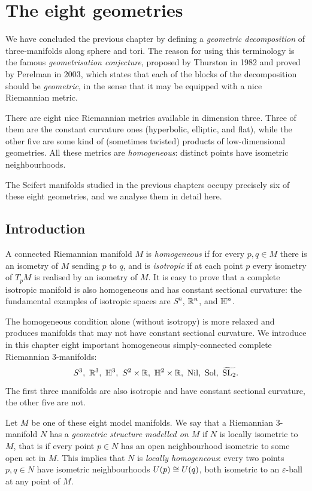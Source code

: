 \chapter{The eight geometries} \label{eight:chapter}
We have concluded the previous chapter by defining a \emph{geometric decomposition} of three-manifolds along sphere and tori. The reason for using this terminology is the famous \emph{geometrisation conjecture}, proposed by Thurston in 1982 and proved by Perelman in 2003, which states that each of the blocks of the decomposition should be \emph{geometric}, in the sense that it may be equipped with a nice Riemannian metric.

There are eight nice Riemannian metrics available in dimension three. Three of them are the constant curvature ones (hyperbolic, elliptic, and flat), while the other five are some kind of (sometimes twisted) products of low-dimensional geometries. All these metrics are \emph{homogeneous}: distinct points have isometric neighbourhoods.

The Seifert manifolds studied in the previous chapters occupy precisely six of these eight geometries, and we analyse them in detail here.

\section{Introduction}
A connected Riemannian manifold $M$ is \emph{homogeneous} if for every $p,q\in M$ there is an isometry of $M$ sending $p$ to $q$, and is \emph{isotropic} if at each point $p$ every isometry of $T_pM$ is realised by an isometry of $M$. It is easy to prove that a complete isotropic manifold is also homogeneous and has constant sectional curvature: the fundamental examples of isotropic spaces are $S^n$, $\mathbb{R}^n$, and $\mathbb{H}^n$.

The homogeneous condition alone (without isotropy) is more relaxed and produces manifolds that may not have constant sectional curvature.
We introduce in this chapter eight important homogeneous simply-connected complete Riemannian 3-manifolds:
$$S^3,\ \matR^3,\ \matH^3,\ S^2\times \matR,\ \matH^2\times \matR,\ \Nil,\ \Sol,\ \widetilde{\SL_2}.$$
The first three manifolds are also isotropic and have constant sectional curvature, the other five are not. 

Let $M$ be one of these eight model manifolds. We say that a Riemannian 3-manifold $N$ has a \emph{geometric structure modelled on $M$} if $N$ is locally isometric to $M$, that is if every point $p\in N$ has an open neighbourhood isometric to some open set in $M$. This implies that $N$ is \emph{locally homogeneous}: every two points $p,q\in N$ have isometric neighbourhoods $U(p) \cong U(q)$, both isometric to an $\varepsilon$-ball at any point of $M$.

